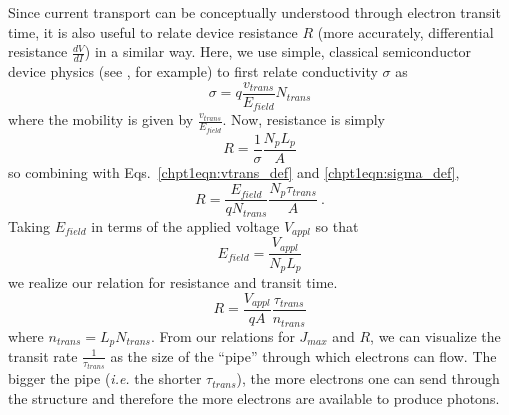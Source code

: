 \documentclass[12pt]{report}
\begin{document}
{Since current transport can be conceptually understood through electron transit time, it is also useful to relate device resistance $R$ (more accurately, differential resistance $\frac{d V}{d\!I}$) in a similar way.  Here, we use simple, classical semiconductor device physics (see \cite{Sze}, for example) to first relate conductivity $\sigma$ as
\begin{equation}
\label{chpt1eqn:sigma_def}
\sigma = q  \frac{v_{trans}}{E_{field}} N_{trans}
\end{equation}
where the mobility is given by $\frac{v_{trans}}{E_{field}}$.  Now, resistance is simply
\begin{equation}
R = \frac{1}{\sigma} \frac{N_p L_p}{A}
\end{equation}
so combining with Eqs.~\eqref{chpt1eqn:vtrans_def} and \eqref{chpt1eqn:sigma_def},
\begin{equation}
R = \frac{E_{field}}{q N_{trans}} \frac{N_p \tau_{trans}}{A} {~.}
\end{equation}
Taking $E_{field}$ in terms of the applied voltage $V_{appl}$ so that
\begin{equation}
E_{field} = \frac{V_{appl}}{N_p L_p}
\end{equation}
we realize our relation for resistance and transit time.
\begin{equation}
R = \frac{V_{appl}}{q A} \frac{\tau_{trans}}{n_{trans}}
\end{equation}
where $n_{trans}=L_p N_{trans}$.  From our relations for $J_{max}$ and $R$, we can visualize the transit rate $\frac{1}{\tau_{trans}}$ as the size of the ``pipe'' through which electrons can flow.  The bigger the pipe (\emph{i.e.} the shorter $\tau_{trans}$), the more electrons one can send through the structure and therefore the more electrons are available to produce photons.





}
\end{document}
